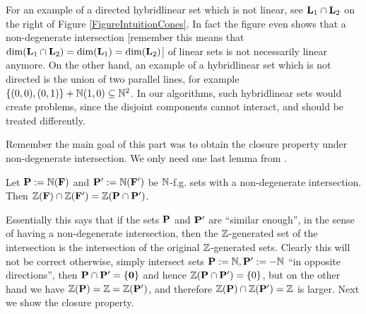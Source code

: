 For an example of a directed hybridlinear set which is not linear, see \(\mathbf{L}_1 \cap \mathbf{L}_2\) on the right of Figure \ref{FigureIntuitionCones}. In fact the figure even shows that a non-degenerate intersection [remember this means that \(\dim(\mathbf{L}_1 \cap \mathbf{L}_2)=\dim(\mathbf{L}_1)=\dim(\mathbf{L}_2)\)] of linear sets is not necessarily linear anymore. On the other hand, an example of a hybridlinear set which is not directed is the union of two parallel lines, for example \(\{(0,0), (0,1)\}+ \mathbb{N} (1,0) \subseteq \mathbb{N}^2\). In our algorithms, such hybridlinear sets would create problems, since the disjoint components cannot interact, and should be treated differently.

Remember the main goal of this part was to obtain the closure property under non-degenerate intersection. We only need one last lemma from \cite{GuttenbergRE23}.

\begin{lemma}
Let \(\mathbf{P}:=\mathbb{N}(\mathbf{F})\) and \(\mathbf{P}':=\mathbb{N}(\mathbf{F}')\) be \(\mathbb{N}\)-f.g. sets with a non-degenerate intersection. Then \(\mathbb{Z}(\mathbf{F}) \cap \mathbb{Z}(\mathbf{F}')=\mathbb{Z}(\mathbf{P} \cap \mathbf{P}')\).\label{LemmaFinitelyGeneratedNondegenerateIntersection}%
\end{lemma}

Essentially this says that if the sets \(\mathbf{P}\) and \(\mathbf{P}'\) are ``similar enough'', in the sense of having a non-degenerate intersection, then the  \(\mathbb{Z}\)-generated set of the intersection is the intersection of the original \(\mathbb{Z}\)-generated sets. Clearly this will not be correct otherwise, simply intersect sets \(\mathbf{P}:=\mathbb{N}, \mathbf{P}':=-\mathbb{N}\) ``in opposite directions'', then \(\mathbf{P} \cap \mathbf{P}'=\{\mathbf{0}\}\) and hence \(\mathbb{Z}(\mathbf{P} \cap \mathbf{P}')=\{0\}\), but on the other hand we have \(\mathbb{Z}(\mathbf{P})=\mathbb{Z}=\mathbb{Z}(\mathbf{P}')\), and therefore \(\mathbb{Z}(\mathbf{P})\cap \mathbb{Z}(\mathbf{P}')=\mathbb{Z}\) is larger. Next we show the closure property.

\LemmaDirectedHybridlinearNondegenerateIntersection*

